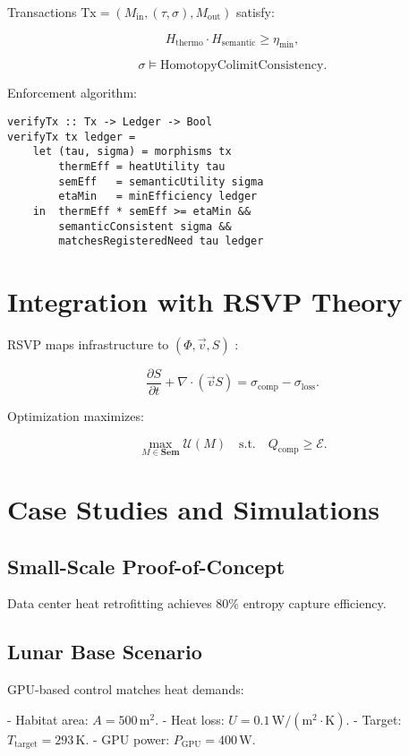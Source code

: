 \documentclass[12pt]{article}
\begin{document}
Transactions $ \mathrm{Tx} = (M_{\mathrm{in}}, (\tau, \sigma), M_{\mathrm{out}}) $ satisfy:

\[ H_{\mathrm{thermo}} \cdot H_{\mathrm{semantic}} \geq \eta_{\min}, \]

\[ \sigma \models \text{HomotopyColimitConsistency}. \]

Enforcement algorithm:

\begin{verbatim}
verifyTx :: Tx -> Ledger -> Bool
verifyTx tx ledger =
    let (tau, sigma) = morphisms tx
        thermEff = heatUtility tau
        semEff   = semanticUtility sigma
        etaMin   = minEfficiency ledger
    in  thermEff * semEff >= etaMin &&
        semanticConsistent sigma &&
        matchesRegisteredNeed tau ledger
\end{verbatim}

\section{Integration with RSVP Theory}
\label{sec:rsvp-integration}

RSVP maps infrastructure to $ (\Phi, \vec{v}, S) $ \citep{Shulman2012}:

\[ \frac{\partial S}{\partial t} + \nabla \cdot (\vec{v} S) = \sigma_{\mathrm{comp}} - \sigma_{\mathrm{loss}}. \]

Optimization maximizes:

\[ \max_{M \in \mathbf{Sem}} \mathcal{U}(M) \quad \text{s.t.} \quad Q_{\mathrm{comp}} \geq \mathcal{E}. \]

\section{Case Studies and Simulations}
\label{sec:case-studies}

\subsection{Small-Scale Proof-of-Concept}

Data center heat retrofitting achieves 80\% entropy capture efficiency.

\subsection{Lunar Base Scenario}

GPU-based control matches heat demands:

- Habitat area: $ A = 500 \, \text{m}^2 $.
- Heat loss: $ U = 0.1 \, \text{W}/(\text{m}^2 \cdot \text{K}) $.
- Target: $ T_{\text{target}} = 293 \, \text{K} $.
- GPU power: $ P_{\text{GPU}} = 400 \, \text{W} $.
\end{document}
